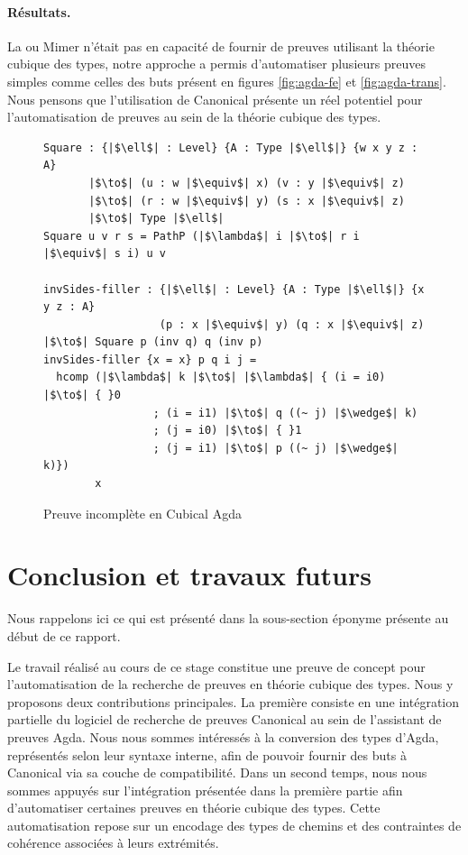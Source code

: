 \documentclass[11pt]{article}
\begin{document}
\paragraph{Résultats.}
La ou Mimer n'était pas en capacité de fournir de preuves utilisant la théorie cubique des types, 
notre approche a permis d'automatiser plusieurs preuves simples comme celles des buts présent en figures \ref{fig:agda-fe} et \ref{fig:agda-trans}.
Nous pensons que l'utilisation de Canonical présente un réel potentiel pour l'automatisation de preuves au sein de la théorie cubique des types.

\begin{figure}[h]
\centering
\begin{verbatim}
Square : {|$\ell$| : Level} {A : Type |$\ell$|} {w x y z : A}
       |$\to$| (u : w |$\equiv$| x) (v : y |$\equiv$| z)
       |$\to$| (r : w |$\equiv$| y) (s : x |$\equiv$| z)
       |$\to$| Type |$\ell$|
Square u v r s = PathP (|$\lambda$| i |$\to$| r i |$\equiv$| s i) u v

invSides-filler : {|$\ell$| : Level} {A : Type |$\ell$|} {x y z : A} 
                  (p : x |$\equiv$| y) (q : x |$\equiv$| z) |$\to$| Square p (inv q) q (inv p)
invSides-filler {x = x} p q i j =
  hcomp (|$\lambda$| k |$\to$| |$\lambda$| { (i = i0) |$\to$| { }0
                 ; (i = i1) |$\to$| q ((~ j) |$\wedge$| k)
                 ; (j = i0) |$\to$| { }1 
                 ; (j = i1) |$\to$| p ((~ j) |$\wedge$| k)})
        x
\end{verbatim}
\caption{Preuve incomplète en Cubical Agda}
\label{fig:agda-hard}
\end{figure}

\section{Conclusion et travaux futurs}
Nous rappelons ici ce qui est présenté dans la sous-section éponyme présente au début de ce rapport.

Le travail réalisé au cours de ce stage constitue une preuve de concept pour l’automatisation de la recherche de preuves en théorie cubique des types.
Nous y proposons deux contributions principales. 
La première consiste en une intégration partielle du logiciel de recherche de preuves Canonical au sein de l’assistant de preuves Agda. 
Nous nous sommes intéressés à la conversion des types d’Agda, représentés selon leur syntaxe interne, 
afin de pouvoir fournir des buts à Canonical via sa couche de compatibilité.
Dans un second temps, nous nous sommes appuyés sur l’intégration présentée dans la première partie afin d’automatiser certaines preuves en théorie cubique des types. 
Cette automatisation repose sur un encodage des types de chemins et des contraintes de cohérence associées à leurs extrémités.
\end{document}
